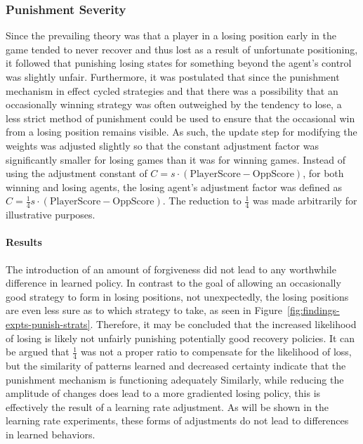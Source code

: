 
\subsubsection*{Punishment Severity}
\label{sec:findings-expts-punishments}

Since the prevailing theory was that a player in a losing position
early in the game tended to never recover and thus lost as a result of
unfortunate positioning,
it followed that punishing losing states for something beyond the agent's
control was slightly unfair.
%
Furthermore,
it was postulated that since the punishment mechanism in effect cycled
strategies
and that there was a possibility that an occasionally winning strategy was often
outweighed by the tendency to lose,
a less strict method of punishment could be used to ensure that the occasional
win from a losing position remains visible.
%
As such,
the update step for modifying the weights was adjusted slightly
so that the constant adjustment factor was significantly smaller for losing
games than it was for winning games.
%
Instead of using the adjustment constant of
$C = s \cdot (\text{PlayerScore} - \text{OppScore})$,
for both winning and losing agents,
the losing agent's adjustment factor was defined as
$C = \frac{1}{4} s \cdot (\text{PlayerScore} - \text{OppScore})$.
%
The reduction to $\frac{1}{4}$ was made arbitrarily for illustrative purposes.

\paragraph*{Results}

The introduction of an amount of forgiveness did not lead to any worthwhile
difference in learned policy.
%
In contrast to the goal of allowing an occasionally good strategy to form
in losing positions,
not unexpectedly,
the losing positions are even less sure as to which strategy to take,
as seen in Figure~\ref{fig:findings-expts-punish-strats}.
%
Therefore,
it may be concluded that the increased likelihood of losing is 
likely not unfairly punishing potentially good recovery policies.
%
It can be argued that $\frac{1}{4}$ was not a proper ratio
to compensate for the likelihood of loss,
but the similarity of patterns learned and decreased certainty
indicate that the punishment mechanism is functioning adequately
%
Similarly,
while reducing the amplitude of changes
does lead to a more gradiented losing policy,
this is effectively the result of a learning rate adjustment.
%
As will be shown in the learning rate experiments,
these forms of adjustments do not lead to differences in learned behaviors.



